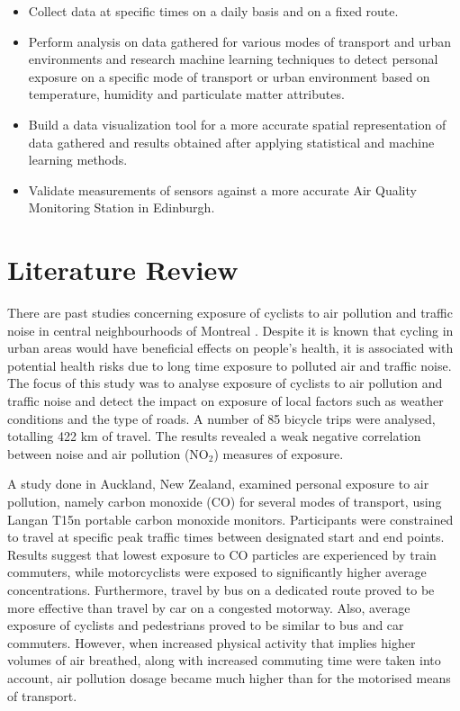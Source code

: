 \documentclass[bsc,frontabs,twoside,singlespacing, parskip,deptreport]{infthesis}     %
\begin{document}
\begin{itemize}
\item Collect data at specific times on a daily basis and on a fixed route.
\item Perform analysis on data gathered for various modes of transport and urban environments and research machine learning techniques to detect personal exposure on a specific mode of transport or urban environment based on temperature, humidity and particulate matter attributes.
\item Build a data visualization tool for a more accurate spatial representation of data gathered and results obtained after applying statistical and machine learning methods.
\item Validate measurements of sensors against a more accurate Air Quality Monitoring Station in Edinburgh.
\end{itemize}

\section{Literature Review}

There are past studies concerning exposure of cyclists to air pollution and traffic noise in central neighbourhoods of Montreal \cite{Apparicio201663}. Despite it is known that cycling in urban areas would have beneficial effects on people's health, it is associated with potential health risks due to long time exposure to polluted air and traffic noise. The focus of this study was to analyse exposure of cyclists to air pollution and traffic noise and detect the impact on exposure of local factors such as weather conditions and the type of roads. A number of 85 bicycle trips were analysed, totalling 422 km of travel. The results revealed a weak negative correlation between noise and air pollution (NO$_2$) measures of exposure.

A study \cite{Dirks2012} done in Auckland, New Zealand, examined personal exposure to air pollution, namely carbon monoxide (CO) for several modes of transport, using Langan T15n \cite{Langan} portable carbon monoxide monitors. Participants were constrained to travel at specific peak traffic times between designated start and end points. Results suggest that lowest exposure to CO particles are experienced by train commuters, while motorcyclists were exposed to significantly higher average concentrations. Furthermore, travel by bus on a dedicated route proved to be more effective than travel by car on a congested motorway. Also, average exposure of cyclists and pedestrians proved to be similar to bus and car commuters. However, when increased physical activity that implies higher volumes of air breathed, along with increased commuting time were taken into account, air pollution dosage became much higher than for the motorised means of transport.
\end{document}
